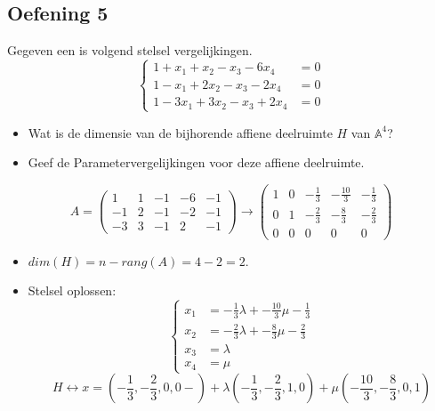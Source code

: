 \documentclass[main.tex]{subfiles}
\begin{document}
\subsection*{Oefening 5}
Gegeven een is volgend stelsel vergelijkingen.
\[
\left\{
  \begin{array}{cc}
    1 + x_{1} + x_{2} - x_{3} - 6x_{4} &= 0\\
    1 - x_{1} + 2x_{2} - x_{3} - 2x_{4} &= 0\\
    1 - 3x_{1} + 3x_{2} - x_{3} + 2x_{4} &= 0
  \end{array}
\right.
\]
\begin{itemize}
\item Wat is de dimensie van de bijhorende affiene deelruimte $H$ van $\mathbb{A}^{4}$?
\item Geef de Parametervergelijkingen voor deze affiene deelruimte.
\end{itemize}

\[ 
A = 
\begin{pmatrix}
    1 & 1 & -1 & -6 & -1\\
    -1 & 2 & -1 & -2 & -1\\
    -3 & 3 & -1 & 2 & -1
\end{pmatrix}
\rightarrow
\begin{pmatrix}
  1 & 0 & -\frac{1}{3} & -\frac{10}{3} & -\frac{1}{3}\\
  0 & 1 & -\frac{2}{3} & -\frac{8}{3}  & -\frac{2}{3}\\
  0 & 0 & 0            & 0             & 0
\end{pmatrix}
\] 
\begin{itemize}
\item $dim(H) = n - rang(A) = 4 - 2 = 2$.
\item Stelsel oplossen:
  \[
  \left\{
  \begin{array}{cl}
    x_{1} &= -\frac{1}{3} \lambda + -\frac{10}{3} \mu -\frac{1}{3}\\
    x_{2} &= -\frac{2}{3} \lambda + -\frac{8}{3}  \mu -\frac{2}{3}\\
    x_{3} &= \lambda\\
    x_{4} &= \mu
  \end{array}
  \right.
  \]
  \[ H \leftrightarrow x = \left(-\frac{1}{3},-\frac{2}{3},0,0-\right) + \lambda\left(-\frac{1}{3},-\frac{2}{3},1,0\right) + \mu\left(-\frac{10}{3},-\frac{8}{3},0,1\right) \]
\end{itemize}
\end{document}
